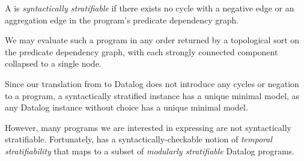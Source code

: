 \begin{definition}
%
A \slang is \emph{syntactically stratifiable} if there
exists no cycle with a negative edge or an aggregation edge in the program's
predicate dependency graph.
%
\end{definition}


We may evaluate such a program in any order returned by a topological sort on
the predicate dependency graph, with each strongly connected component
collapsed to a single node.

Since our translation from \slang to Datalog does not introduce any cycles or
negation to a program, a syntactically stratified \slang instance has a
unique minimal model, as any Datalog instance without choice has a unique
minimal model. 

%
%

%

%

However, many programs we are interested in expressing are not syntactically
stratifiable.  Fortunately, \slang has a syntactically-checkable notion of
{\em temporal stratifiability} that maps to a subset of {\em modularly
stratifiable} Datalog programs.

